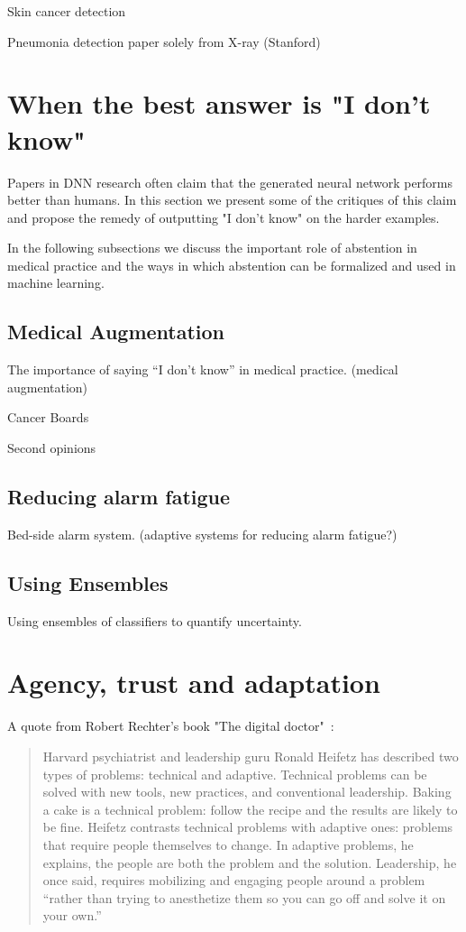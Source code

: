 \documentclass[fleqn,10pt]{wlscirep}
\begin{document}
Skin cancer detection~\cite{esteva2017dermatologist}

Pneumonia detection paper solely from X-ray (Stanford)

\section{When the best answer is "I don't know"}

Papers in DNN research often claim that the generated neural network performs better than humans. In this section we present some of the critiques of this claim and propose the remedy of outputting "I don't know" on the harder examples.

In the following subsections we discuss the important role of abstention in medical practice and the ways in which abstention can be formalized and used in machine learning.

\subsection*{Medical Augmentation}
The importance of saying “I don’t know” in medical practice. (medical augmentation)

Cancer Boards

Second opinions

\subsection*{Reducing alarm fatigue}
Bed-side alarm system. (adaptive systems for reducing alarm fatigue?)

\subsection*{Using Ensembles}

Using ensembles of classifiers to quantify uncertainty.

\section{Agency, trust and adaptation}

A quote from Robert Rechter's book "The digital doctor"~\cite{wachter2015digital}:
\begin{quote}
    Harvard psychiatrist and leadership guru Ronald Heifetz has described two types of problems: technical and adaptive. Technical problems can be solved with new tools, new practices, and conventional leadership. Baking a cake is a technical problem: follow the recipe and the results are likely to be fine. Heifetz contrasts technical problems with adaptive ones: problems that require people themselves to change. In adaptive problems, he explains, the people
    are both the problem and the solution. Leadership, he once said, requires mobilizing and engaging people around a problem “rather than trying to anesthetize them so you can go off and solve it on your own.” 
\end{quote}
\end{document}
